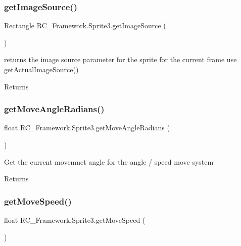 \subsubsection{\texorpdfstring{get\+Image\+Source()}{getImageSource()}}
{\footnotesize\ttfamily Rectangle R\+C\+\_\+\+Framework.\+Sprite3.\+get\+Image\+Source (\begin{DoxyParamCaption}{ }\end{DoxyParamCaption})}



returns the image source parameter for the sprite for the current frame use \mbox{\hyperlink{class_r_c___framework_1_1_sprite3_a376a1cca122797eb306bc81d31e91551}{get\+Actual\+Image\+Source()}} 

\begin{DoxyReturn}{Returns}

\end{DoxyReturn}
\mbox{\label{class_r_c___framework_1_1_sprite3_a71a24dd1eb93a65918e2b1db390a5546}} 
\subsubsection{\texorpdfstring{get\+Move\+Angle\+Radians()}{getMoveAngleRadians()}}
{\footnotesize\ttfamily float R\+C\+\_\+\+Framework.\+Sprite3.\+get\+Move\+Angle\+Radians (\begin{DoxyParamCaption}{ }\end{DoxyParamCaption})}



Get the current movemnet angle for the angle / speed move system 

\begin{DoxyReturn}{Returns}

\end{DoxyReturn}
\mbox{\label{class_r_c___framework_1_1_sprite3_a1534ae3b4f4a7b075661e0d644d589cf}} 
\subsubsection{\texorpdfstring{get\+Move\+Speed()}{getMoveSpeed()}}
{\footnotesize\ttfamily float R\+C\+\_\+\+Framework.\+Sprite3.\+get\+Move\+Speed (\begin{DoxyParamCaption}{ }\end{DoxyParamCaption})}



